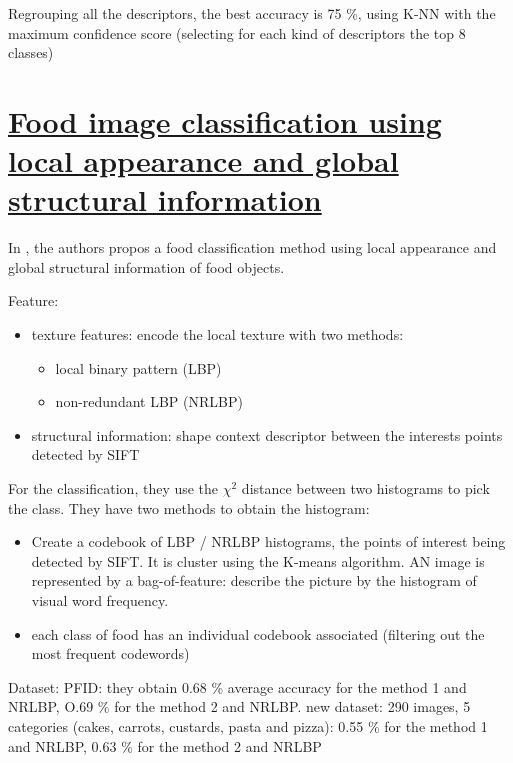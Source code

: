 Regrouping all the descriptors, the best accuracy is 75 \%, using K-NN with the maximum confidence score (selecting for each kind of descriptors the top 8 classes)

\section{\href{http://www.sciencedirect.com/science/article/pii/S0925231214004317}{Food image classification using local appearance and global structural information}}

In \cite{Nguyen2014}, the authors propos a food classification method using local appearance and global structural information of food objects.

Feature:
\begin{itemize}
    \item texture features: encode the local texture with two methods:
    \begin{itemize}
        \item local binary pattern (LBP)
        \item non-redundant LBP (NRLBP)
    \end{itemize}
    \item structural information: shape context descriptor between the interests points detected by SIFT
\end{itemize}


For the classification, they use the $\chi^2$ distance between two histograms to pick the class. They have two methods to obtain the histogram:
\begin{itemize}
    \item Create a codebook of LBP / NRLBP histograms, the points of interest being detected by SIFT. It is cluster using the K-means algorithm.
    AN image is represented by a bag-of-feature: describe the picture by the histogram of visual word frequency.
    \item each class of food has an individual codebook associated (filtering out the most frequent codewords)
\end{itemize}

Dataset: PFID: they obtain 0.68 \% average accuracy for the method 1 and NRLBP, O.69 \% for the method 2 and NRLBP.
new dataset: 290 images, 5 categories (cakes, carrots, custards, pasta and pizza): 0.55 \% for the method 1 and NRLBP, 0.63 \% for the method 2 and NRLBP
